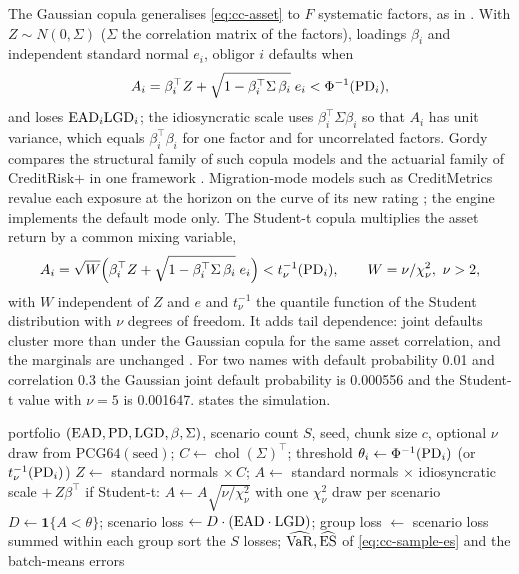 The Gaussian copula generalises \cref{eq:cc-asset} to $F$ systematic factors, as in \citet{credit-capital:li2000}. With $Z\sim N(0,\Sigma)$
($\Sigma$ the correlation matrix of the factors), loadings $\beta_i$ and independent standard normal $e_i$, obligor $i$ defaults when
\begin{equation}
A_i=\beta_i^{\top}Z+\sqrt{1-\beta_i^{\top}\Sigma\,\beta_i}\;e_i<\Phi^{-1}(\mathrm{PD}_i),
\label{eq:cc-gaussian}
\end{equation}
and loses $\mathrm{EAD}_i\mathrm{LGD}_i$; the idiosyncratic scale uses $\beta_i^{\top}\Sigma\beta_i$ so that $A_i$ has unit variance, which equals
$\beta_i^\top\beta_i$ for one factor and for uncorrelated factors. Gordy compares the structural family of such copula models and the actuarial family of
CreditRisk+ in one framework \citep{credit-capital:gordy2000}. Migration-mode models such as CreditMetrics revalue each exposure at the horizon on
the curve of its new rating \citep{credit-capital:creditmetrics1997}; the engine implements the default mode only. The Student-t copula multiplies the
asset return by a common mixing variable,
\begin{equation}
A_i=\sqrt{W}\Big(\beta_i^{\top}Z+\sqrt{1-\beta_i^{\top}\Sigma\,\beta_i}\;e_i\Big)<t_\nu^{-1}(\mathrm{PD}_i),\qquad W=\nu/\chi^2_\nu,\ \nu>2,
\label{eq:cc-student}
\end{equation}
with $W$ independent of $Z$ and $e$ and $t_\nu^{-1}$ the quantile function of the Student distribution with $\nu$ degrees of freedom. It
adds tail dependence: joint defaults cluster more than under the Gaussian copula for the same asset correlation, and the marginals are
unchanged \citep{credit-capital:freymcneil2003,credit-capital:demartamcneil2005}. For two names with default probability 0.01 and
correlation 0.3 the Gaussian joint default probability is 0.000556 and the Student-t value with $\nu=5$ is 0.001647. 
states the simulation.

\begin{algorithm}[htbp]
\caption{Chunked copula Monte Carlo of the portfolio loss with Euler tracking by group.}
\label{alg:cc-copula}
\begin{algorithmic}[1]
\Require portfolio $(\mathrm{EAD},\mathrm{PD},\mathrm{LGD},\beta,\Sigma)$, scenario count $S$, seed, chunk size $c$, optional $\nu$
\State draw from $\mathrm{PCG64}(\text{seed})$; $C\gets\operatorname{chol}(\Sigma)^{\top}$; threshold $\theta_i\gets\Phi^{-1}(\mathrm{PD}_i)$ (or $t_\nu^{-1}(\mathrm{PD}_i)$)
\State $Z\gets$ standard normals $\times\,C$; $A\gets$ standard normals $\times$ idiosyncratic scale $+\,Z\beta^{\top}$
\State if Student-t: $A\gets A\sqrt{\nu/\chi^2_\nu}$ with one $\chi^2_\nu$ draw per scenario
\State $D\gets\mathbf{1}\{A<\theta\}$; scenario loss $\gets D\cdot(\mathrm{EAD}\cdot\mathrm{LGD})$; group loss $\gets$ scenario loss summed within each group
\EndFor
\State sort the $S$ losses; \Return $\widehat{\operatorname{VaR}},\widehat{\operatorname{ES}}$ of \cref{eq:cc-sample-es} and the batch-means errors
\end{algorithmic}
\end{algorithm}

